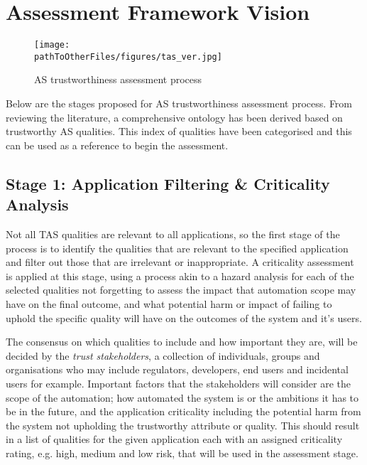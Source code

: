 \section{Assessment Framework Vision} \label{sec:AssFramVis}

\begin{figure*}[]
    \centering
    \texttt{[image: \\pathToOtherFiles/figures/tas\_ver.jpg]}
    \caption{AS trustworthiness assessment process}
    \label{fig:tas_ver}
\end{figure*}

Below are the stages proposed for AS trustworthiness assessment process.
%
From reviewing the literature, a comprehensive ontology has been derived based on trustworthy AS qualities. This index of qualities have been categorised and this can be used as a reference to begin the assessment. 


\subsection{Stage 1: Application Filtering \& Criticality Analysis}

Not all TAS qualities are relevant to all applications, so the first stage of the process is to identify the qualities that are relevant to the specified application and filter out those that are irrelevant or inappropriate. 
%
A criticality assessment is applied at this stage, using a process akin to a hazard analysis for each of the selected qualities not forgetting to assess the impact that automation scope may have on the final outcome, and what potential harm or impact of failing to uphold the specific quality will have on the outcomes of the system and it's users. 

The consensus on which qualities to include and how important they are, will be decided by the \emph{trust stakeholders}, a collection of individuals, groups and organisations who may include regulators, developers, end users and incidental users for example. 
%
Important factors that the stakeholders will consider are the scope of the automation; how automated the system is or the ambitions it has to be in the future, and the application criticality including the potential harm from the system not upholding the trustworthy attribute or quality. 
%
This should result in a list of qualities for the given application each with an assigned criticality rating, e.g. high, medium and low risk, that will be used in the assessment stage. 


